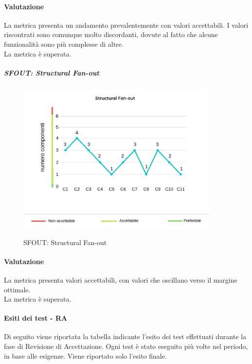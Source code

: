 	\paragraph*{Valutazione} La metrica presenta un andamento prevalentemente con valori accettabili. I valori riscontrati sono comunque molto discordanti, dovute al fatto che alcune funzionalità sono più complesse di altre.
	\\ La metrica è superata.
	\pagebreak
	\subparagraph{SFOUT: Structural Fan-out}
	\begin{center}
		\begin{figure}[h] 
			\centering 
			\includegraphics[width=0.90\textwidth]{res/images/new/sfout.png}\\
			\caption{SFOUT: Structural Fan-out}
		\end{figure}
	\end{center}
	\paragraph*{Valutazione} La metrica presenta valori accettabili, con valori che oscillano verso il margine ottimale.
	\\ La metrica è superata.
	\pagebreak

\paragraph{Esiti dei test - RA}

Di seguito viene riportata la tabella indicante l'esito dei test effettuati durante la fase di Revisione di Accettazione. Ogni test è stato eseguito più volte nel periodo, in base alle esigenze. Viene riportato solo l'esito finale.

